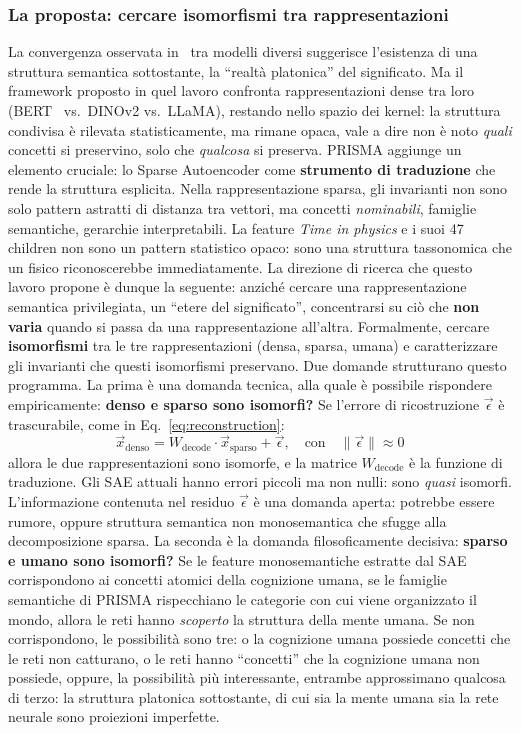 \subsubsection{La proposta: cercare isomorfismi tra rappresentazioni}
\label{subsubsec:proposta_isomorfismi}
La convergenza osservata in~\parencite{huh2024platonic} tra modelli diversi suggerisce l'esistenza di una struttura semantica sottostante, la ``realtà platonica'' del significato. Ma il framework proposto in quel lavoro confronta rappresentazioni dense tra loro (BERT~\parencite{devlin2018bert} vs.\ DINOv2 vs.\ LLaMA), restando nello spazio dei kernel: la struttura condivisa è rilevata statisticamente, ma rimane opaca, vale a dire non è noto \textit{quali} concetti si preservino, solo che \textit{qualcosa} si preserva.
PRISMA aggiunge un elemento cruciale: lo Sparse Autoencoder come \textbf{strumento di traduzione} che rende la struttura esplicita. Nella rappresentazione sparsa, gli invarianti non sono solo pattern astratti di distanza tra vettori, ma concetti \textit{nominabili}, famiglie semantiche, gerarchie interpretabili. La feature \textit{Time in physics} e i suoi 47 children non sono un pattern statistico opaco: sono una struttura tassonomica che un fisico riconoscerebbe immediatamente.
La direzione di ricerca che questo lavoro propone è dunque la seguente: anziché cercare una rappresentazione semantica privilegiata, un ``etere del significato'', concentrarsi su ciò che \textbf{non varia} quando si passa da una rappresentazione all'altra. Formalmente, cercare \textbf{isomorfismi} tra le tre rappresentazioni (densa, sparsa, umana) e caratterizzare gli invarianti che questi isomorfismi preservano. Due domande strutturano questo programma.
La prima è una domanda tecnica, alla quale è possibile rispondere empiricamente: \textbf{denso e sparso sono isomorfi?} Se l'errore di ricostruzione $\vec{\epsilon}$ è trascurabile, come in Eq.~\ref{eq:reconstruction}:
\begin{equation}
    \vec{x}_{\text{denso}} = W_{\text{decode}} \cdot \vec{x}_{\text{sparso}} + \vec{\epsilon}, \quad \text{con} \quad \|\vec{\epsilon}\| \approx 0
    \label{eq:reconstruction}
\end{equation}
allora le due rappresentazioni sono isomorfe, e la matrice $W_{\text{decode}}$ è la funzione di traduzione. Gli SAE attuali hanno errori piccoli ma non nulli: sono \textit{quasi} isomorfi. L'informazione contenuta nel residuo $\vec{\epsilon}$ è una domanda aperta: potrebbe essere rumore, oppure struttura semantica non monosemantica che sfugge alla decomposizione sparsa.
La seconda è la domanda filosoficamente decisiva: \textbf{sparso e umano sono isomorfi?} Se le feature monosemantiche estratte dal SAE corrispondono ai concetti atomici della cognizione umana, se le famiglie semantiche di PRISMA rispecchiano le categorie con cui viene organizzato il mondo, allora le reti hanno \textit{scoperto} la struttura della mente umana. Se non corrispondono, le possibilità sono tre: o la cognizione umana possiede concetti che le reti non catturano, o le reti hanno ``concetti'' che la cognizione umana non possiede, oppure, la possibilità più interessante, entrambe approssimano qualcosa di terzo: la struttura platonica sottostante, di cui sia la mente umana sia la rete neurale sono proiezioni imperfette.
